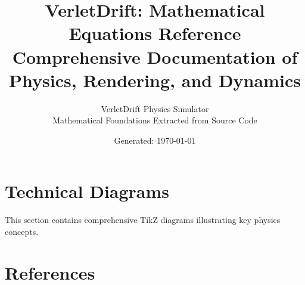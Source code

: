 \documentclass[12pt,a4paper]{article}
\title{%
  VerletDrift: Mathematical Equations Reference \\
  \large Comprehensive Documentation of Physics, Rendering, and Dynamics
}
\author{%
  VerletDrift Physics Simulator \\
  Mathematical Foundations Extracted from Source Code
}
\date{Generated: \today}
\begin{document}
\maketitle

\tableofcontents
\newpage
















\appendix



\newpage
\section{Technical Diagrams}

This section contains comprehensive TikZ diagrams illustrating key physics concepts.




\newpage
\section*{References}



\end{document}
